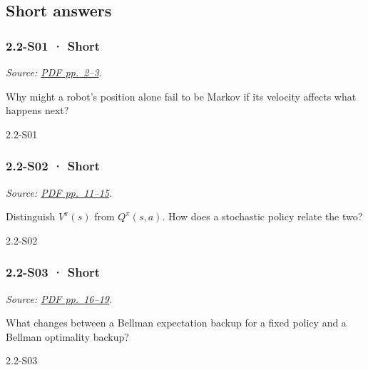 \subsection{Short answers}\label{short-answers-4}

\noindent\begin{minipage}{\linewidth}

\subsubsection{2.2-S01 · Short}\label{s01-short-4}

\emph{Source:
\href{../Lecture\%20Slides/2.2.\%20Markov\%20decision\%20processes.pdf\#page=2}{PDF
pp.~2--3}.}

Why might a robot's position alone fail to be Markov if its velocity
affects what happens next?

\begin{solution}[20mm]{2.2-S01}

\end{solution}
\end{minipage}\par\medskip

\noindent\begin{minipage}{\linewidth}

\subsubsection{2.2-S02 · Short}\label{s02-short-4}

\emph{Source:
\href{../Lecture\%20Slides/2.2.\%20Markov\%20decision\%20processes.pdf\#page=11}{PDF
pp.~11--15}.}

Distinguish \(V^\pi(s)\) from \(Q^\pi(s,a)\). How does a stochastic
policy relate the two?

\begin{solution}[20mm]{2.2-S02}

\end{solution}
\end{minipage}\par\medskip

\noindent\begin{minipage}{\linewidth}

\subsubsection{2.2-S03 · Short}\label{s03-short-4}

\emph{Source:
\href{../Lecture\%20Slides/2.2.\%20Markov\%20decision\%20processes.pdf\#page=16}{PDF
pp.~16--19}.}

What changes between a Bellman expectation backup for a fixed policy and
a Bellman optimality backup?

\begin{solution}[20mm]{2.2-S03}

\end{solution}
\end{minipage}\par\medskip

